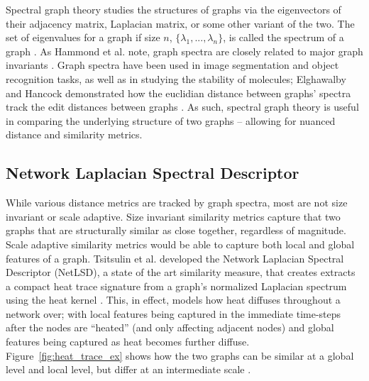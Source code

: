 Spectral graph theory studies the structures of graphs via the eigenvectors of
their adjacency matrix, Laplacian matrix, or some other variant of the two. The
set of eigenvalues for a graph if size $n$, $\{\lambda_{1},...,\lambda_{n}\}$,
is called the spectrum of a graph \cite{netlsd}. As Hammond et al. note, graph
spectra are closely related to major graph invariants \cite{chung1997spectral}.
Graph spectra have been used in image segmentation and object recognition tasks,
as well as in studying the stability of molecules; Elghawalby and Hancock
demonstrated how the euclidian distance between graphs' spectra track the edit
distances between graphs \cite{elghawalby2008measuring,chung1997spectral}. As
such, spectral graph theory is useful in comparing the underlying structure of
two graphs -- allowing for nuanced distance and similarity metrics.   

\subsection{Network Laplacian Spectral Descriptor}\label{sec:NetLSD}

While various distance metrics are tracked by graph spectra, most are not size
invariant or scale adaptive. Size invariant similarity metrics capture that two
graphs that are structurally similar as close together, regardless of magnitude.
Scale adaptive similarity metrics would be able to capture both local and global
features of a graph. Tsitsulin et al. developed the Network Laplacian Spectral
Descriptor (NetLSD), a state of the art similarity measure, that creates
extracts a compact heat trace signature from a graph's normalized Laplacian
spectrum using the heat kernel \cite{netlsd}. This, in effect, models how heat
diffuses throughout a network over; with local features being captured in the
immediate time-steps after the nodes are ``heated'' (and only affecting adjacent
nodes) and global features being captured as heat becomes further diffuse.
Figure~\ref{fig:heat_trace_ex} shows how the two graphs can be similar at a
global level and local level, but differ at an intermediate scale \cite{netlsd}.

